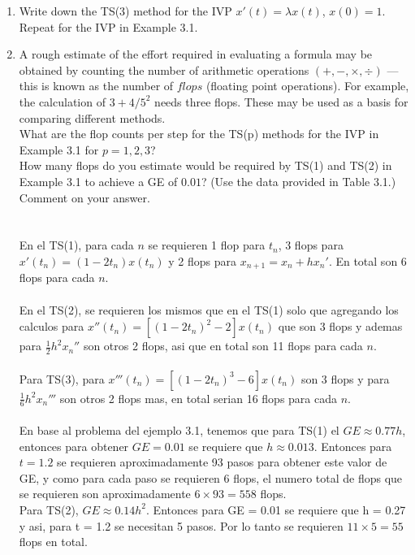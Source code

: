 \begin{enumerate}
	\item
		Write down the TS(3) method for the IVP $x'(t) = \lambda x(t)$, $x(0) = 1$.
		Repeat for the IVP in Example 3.1.
	\item
		A rough estimate of the effort required in evaluating a formula may be obtained by counting the number of arithmetic operations $(+, -, \times, \div)$ — this is known as the number of $flops$ (floating point operations). For example, the calculation of $3 + 4/5^2$ needs three flops. These may be used as a basis for comparing different methods.\\
		What are the flop counts per step for the TS(p) methods for the IVP
		in Example 3.1 for $p = 1, 2, 3$?\\
		How many flops do you estimate would be required by TS(1) and TS(2) in Example 3.1 to achieve a GE of $0.01$? (Use the data provided in Table 3.1.) Comment on your answer.\\
		\\
		\\
		En el TS(1), para cada $n$ se requieren 1 flop para $t_n$, 3 flops para $x'(t_n) = (1-2t_n)x(t_n)$ y 2 flops para $x_{n+1} = x_n + hx_n'$. En total son 6 flops para cada $n$.\\
		\\
		En el TS(2), se requieren los mismos que en el TS(1) solo que agregando los calculos para $x''(t_n) = [(1 - 2t_n)^2 - 2]x(t_n) $ que son 3 flops y ademas para $\frac{1}{2} h^2x_n''$ son otros 2 flops, asi que en total son 11 flops para cada $n$.\\
		\\
		Para TS(3), para $x'''(t_n) = [(1 - 2t_n)^3 - 6]x(t_n) $  son 3 flops y para $\frac{1}{6} h^2x_n'''$ son otros 2 flops mas, en total serian 16 flops para cada $n$.\\
		\\
		En base al problema del ejemplo 3.1, tenemos que para TS(1) el $GE \approx 0.77h$, entonces para obtener $GE = 0.01$ se requiere que $h \approx 0.013$. Entonces para $t = 1.2$ se requieren aproximadamente 93 pasos para obtener este valor de GE, y como para cada paso se requieren 6 flops, el numero total de flops que se requieren son aproximadamente $6 \times 93 = 558$ flops.\\
		Para TS(2), $GE \approx 0.14h^2$. Entonces para GE = 0.01 se requiere que h = 0.27 y asi, para t = 1.2 se necesitan 5 pasos. Por lo tanto se requieren $11 \times 5  = 55$ flops en total.
		

\end{enumerate}
